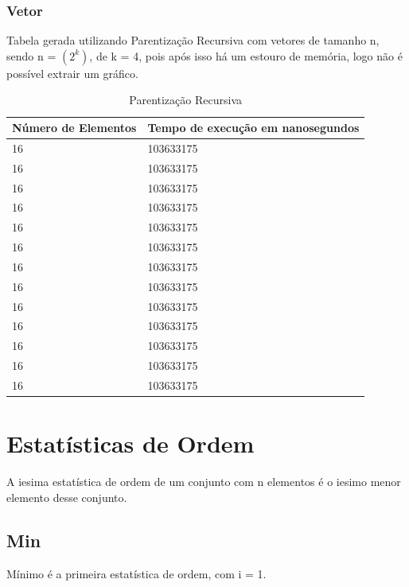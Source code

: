 \documentclass[12pt,a4paper,twoside]{report}
\begin{document}
\subsection{Vetor}
Tabela gerada utilizando Parentização Recursiva com vetores de tamanho n, sendo n = $(2^k)$, de k = 4, pois após isso há um estouro de memória, logo não é possível extrair um gráfico.
\begin{table}[H]
\centering
\caption{Parentização Recursiva}
\label{my-label}
\begin{tabular}{|l|l|}
\hline
\multicolumn{1}{|c|}{\textbf{Número de Elementos}} & \multicolumn{1}{c|}{\textbf{Tempo de execução em nanosegundos}} \\ \hline
16 & 103633175 \\ \hline
16 & 103633175 \\ \hline
16 & 103633175 \\ \hline
16 & 103633175 \\ \hline
16 & 103633175 \\ \hline
16 & 103633175 \\ \hline
16 & 103633175 \\ \hline
16 & 103633175 \\ \hline
16 & 103633175 \\ \hline
16 & 103633175 \\ \hline
16 & 103633175 \\ \hline
16 & 103633175 \\ \hline
16 & 103633175 \\ \hline
\end{tabular}
\end{table}

\chapter{Estatísticas de Ordem}

A iesima estatística de ordem de um conjunto com n elementos é o iesimo menor elemento desse conjunto.

\section{Min}

Mínimo é a primeira estatística de ordem, com i = 1.
\end{document}

